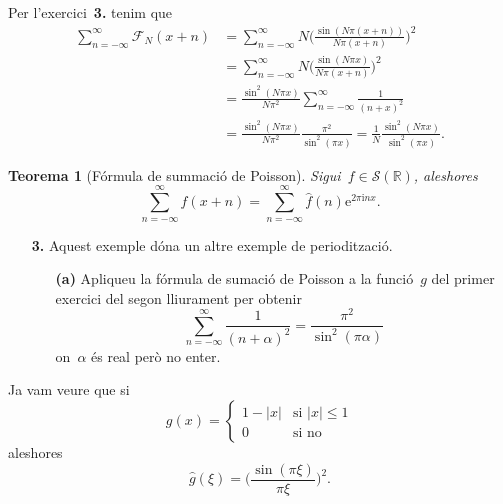 \documentclass[a4paper]{article}
\theoremstyle{plain}
\newtheorem{theorem}{Teorema}
\newcommand{\iu}{\mathrm{i}}
\newcommand{\e}{\mathrm{e}}
\providecommand{\uppi}{\pi}
\newcommand{\abs}[1]{\lvert{#1}\rvert}
\newcommand{\F}{\mathcal{F}}
\newcommand{\Sc}{\mathcal{S}}
\begin{document}
Per l'exercici~\textbf{3.} tenim que
\begin{align*}
    \sum_{n=-\infty}^{\infty} \F_{N}(x+n)
        &=
        \sum_{n=-\infty}^{\infty}
        N\biggl(\frac{\sin(N\uppi (x+n))}{N\uppi (x+n)}\biggr)^{2} \\
        &=
        \sum_{n=-\infty}^{\infty}
        N\biggl(\frac{\sin(N\uppi x)}{N\uppi (x+n)}\biggr)^{2} \\
        &=
        \frac{\sin^{2}(N\uppi x)}{N\uppi^{2}}
        \sum_{n=-\infty}^{\infty}
        \frac{1}{(n+x)^{2}} \\
        &=
        \frac{\sin^{2}(N\uppi x)}{N\uppi^{2}}
        \frac{\uppi^{2}}{\sin^{2}(\uppi x)}
        = \frac{1}{N}\frac{\sin^{2}(N\uppi x)}{\sin^{2}(\uppi x)}.
\end{align*}

\clearpage

\begin{theorem}[Fórmula de summació de Poisson]
    Sigui~\(f\in\Sc(\mathbb{R})\), aleshores
    \[
        \sum_{n=-\infty}^{\infty} f(x+n)
        = \sum_{n=-\infty}^{\infty} \widehat{f}(n) \e^{2\uppi\iu nx}.
    \]
\end{theorem}

\begin{enumerate}
    \item[\textbf{3.}] Aquest exemple dóna un altre exemple de periodització.
        \begin{enumerate}
            \item[\textbf{(a)}] Apliqueu la fórmula de sumació de Poisson a la
                funció~\(g\) del primer exercici del segon lliurament per
                obtenir
                \[
                    \sum_{n=-\infty}^{\infty} \frac{1}{(n+\alpha)^{2}}
                    = \frac{\uppi^{2}}{\sin^{2}(\uppi\alpha)}
                \]
                on~\(\alpha\) és real però no enter.
        \end{enumerate}
\end{enumerate}

Ja vam veure que si
\[
    g(x) = \begin{cases}
        1 - \abs{x} & \text{si } \abs{x} \leq 1 \\
        0 & \text{si no}
    \end{cases}
\]
aleshores
\[
    \widehat{g}(\xi) = \biggl(\frac{\sin(\uppi\xi)}{\uppi\xi}\biggr)^{2}.
\]
\end{document}
